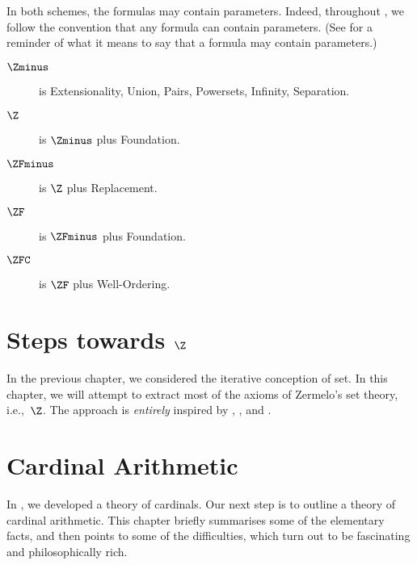 In both schemes, the formulas may contain parameters. Indeed,
throughout , we follow the convention that any
formula can contain parameters. (See
 for a reminder of what it means
to say that a formula may contain parameters.)

\begin{description}
\item[$\Zminus$] is Extensionality, Union, Pairs, Powersets, Infinity, Separation.
\item[$\Z$] is $\Zminus$ plus Foundation.
\item[$\ZFminus$] is $\Z$ plus Replacement.
\item[$\ZF$] is $\ZFminus$ plus Foundation.
\item[$\ZFC$] is $\ZF$ plus Well-Ordering.
\end{description}


\chapter{Steps towards $\Z$}

In the previous chapter, we considered the iterative conception of
set. In this chapter, we will attempt to extract most of the axioms of
Zermelo's set theory, i.e.,~$\Z$. The approach is \emph{entirely}
inspired by \citet{Boolos1971},  \citet{Scott1974}, and
\citet{Shoenfield:AST}. 

\olresetchapter






\chapter{Cardinal Arithmetic}

In , we developed a theory of cardinals.
Our next step is to outline a theory of cardinal arithmetic. This
chapter briefly summarises some of the elementary facts, and then
points to some of the difficulties, which turn out to be fascinating
and philosophically rich.


